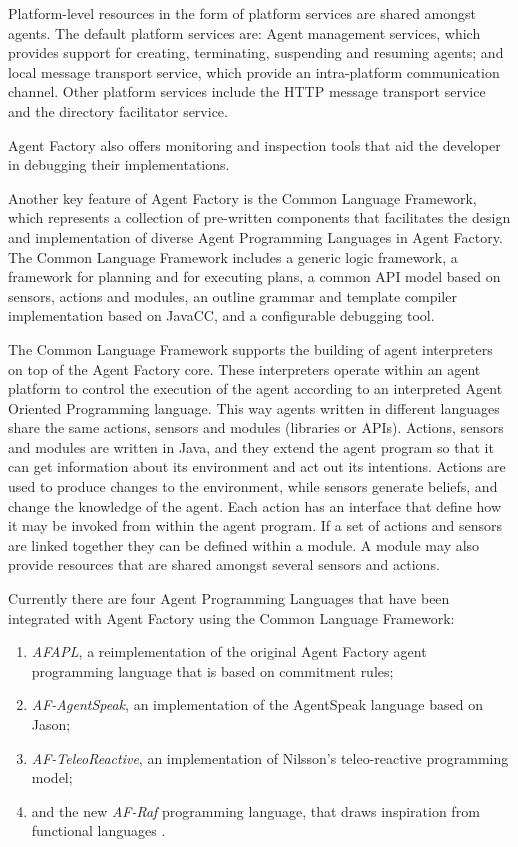 \documentclass[a4paper,12pt,oneside,fleqn]{book} %
\begin{document}
Platform-level resources in the form of platform services are shared
amongst agents. The default platform services are: Agent management
services, which provides support for creating, terminating, suspending and
resuming agents; and local message transport service, which provide an
intra-platform communication channel. Other platform services include the
HTTP message transport service and the directory facilitator service.

Agent Factory also offers monitoring and inspection tools that aid the
developer in debugging their implementations.

Another key feature of Agent Factory is the Common Language Framework,
which represents a collection of pre-written components that facilitates
the design and implementation of diverse Agent Programming Languages in
Agent Factory\null. The Common Language Framework includes a generic logic
framework, a framework for planning and for executing plans, a common API
model based on sensors, actions and modules, an outline grammar and
template compiler implementation based on JavaCC, and a configurable
debugging tool.

The Common Language Framework supports the building of agent interpreters
on top of the Agent Factory core. These interpreters operate within an
agent platform to control the execution of the agent according to an
interpreted Agent Oriented Programming language. This way agents written in
different languages share the same actions, sensors and modules (libraries
or APIs). Actions, sensors and modules are written in Java, and they extend
the agent program so that it can get information about its environment and
act out its intentions. Actions are used to produce changes to the
environment, while sensors generate beliefs, and change the knowledge of
the agent. Each action has an interface that define how it may be invoked
from within the agent program. If a set of actions and sensors are linked
together they can be defined within a module. A module may also provide
resources that are shared amongst several sensors and actions.

Currently there are four Agent Programming Languages that have been
integrated with Agent Factory using the Common Language Framework:
\begin{enumerate}

\item \textit{AFAPL}, a reimplementation of the original Agent Factory
agent programming language that is based on commitment rules;

\item \textit{AF-AgentSpeak}, an implementation of the AgentSpeak language based on Jason;

\item \textit{AF-TeleoReactive}, an implementation of Nilsson's teleo-reactive
programming model;

\item and the new \textit{AF-Raf} programming language, that draws
inspiration from functional languages .
\end{enumerate}
\end{document}
